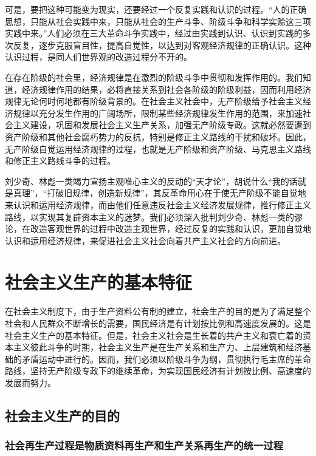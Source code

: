 \documentclass{book}
\begin{document}
可是，要把这种可能变为现实，还要经过一个反复实践和认识的过程。“人的正确思想，只能从社会实践中来，只能从社会的生产斗争、阶级斗争和科学实赊这三项实践中来。”人们必须在三大革命斗争实践中，经过由实践到认识、认识到实践的多次反复，逐步克服盲目性，提高自觉性，以达到对客观经济规律的正确认识。这种认识过程，是同人们世界观的改造过程分不开的。

在存在阶级的社会里，经济规律是在激烈的阶级斗争中贯彻和发挥作用的。我们知道，经济规律作用的结果，必将直接关系到社会各阶级的阶级利益，因而利用经济规律无论何时何地都有阶级背景的。在社会主义社会中，无产阶级给予社会主义经济规律以充分发生作用的广阔场所，限制某些经济规律发生作用的范围，来加速社会主义建设，巩固和发展社会主义生产关系，加强无产阶级专政。这就必然要遭到资产阶级和其他社会腐朽势力的反抗，特别是修正主义路线的干扰和破坏。因此，无产阶级自觉运用经济规律的过程，也就是无产阶级和资产阶级、马克思主义路线和修正主义路线斗争的过程。

刘少奇、林彪一类竭力宣扬主观唯心主义的反动的“天才论”，胡说什么“我的话就是真理”，“打破旧规律，创造新规律”，其反革命用心在于使无产阶级不能自觉地来认识和运用经济规律，而由他们任意违反社会主义经济发展规律，推行修正主义路线，以实现其复辟资本主义的迷梦。我们必须深入批判刘少奇、林彪一类的谬论，在改造客观世界的过程中改造主观世界，经过反复的实践和认识，更加自觉地认识和运用经济规律，来促进社会主义社会向着共产主义社会的方向前进。

\chapter{社会主义生产的基本特征}

在社会主义制度下，由于生产资料公有制的建立，社会生产的目的是为了满足整个社会和人民群众不断增长的需要，国民经济是有计划按比例和高速度发展的。这是社会主义生产的基本特征。但是，社会主义社会是生长着的共产主义和衰亡着的资本主义彼此斗争的时期，社会主义生产是在生产关系和生产力、上层建筑和经济基础的矛盾运动中进行的。因而，我们必须以阶级斗争为纲，贯彻执行毛主席的革命路线，坚持无产阶级专政下的继续革命，为实现国民经济有计划按比例、高速度的发展而努力。

\section{社会主义生产的目的}

\subsection{社会再生产过程是物质资料再生产和生产关系再生产的统一过程}
\end{document}
